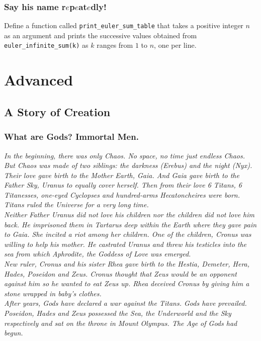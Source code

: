 \documentclass[a4paper]{article}
\begin{document}
\subsubsection{Say his name r$e$p$e$at$e$dly!}
Define a function called \texttt{print\_euler\_sum\_table} that takes a positive integer $n$ as an argument and prints the successive values obtained from \texttt{euler\_infinite\_sum(k)} as $k$ ranges from $1$ to $n$, one per line.


\newpage
\section{Advanced}
\subsection{A Story of Creation}

\subsubsection{What are Gods? Immortal Men.}

\textit{In the beginning, there was only Chaos. No space, no time just endless Chaos. But Chaos was made of two siblings: the darkness (Erebus) and the night (Nyx). Their love gave birth to the Mother Earth, Gaia. And Gaia gave birth to the Father Sky, Uranus to equally cover herself. Then from their love 6 Titans, 6 Titanesses, one-eyed Cyclopses and hundred-arms Hecatoncheires were born. Titans ruled the Universe for a very long time.\\
Neither Father Uranus did not love his children nor the children did not love him back. He imprisoned them in Tartarus deep within the Earth where they gave pain to Gaia. She incited a riot among her children. One of the children, Cronus was willing to help his mother. He castrated Uranus and threw his testicles into the sea from which Aphrodite, the Goddess of Love was emerged.\\
New ruler, Cronus and his sister Rhea gave birth to the Hestia, Demeter, Hera, Hades, Poseidon and Zeus. Cronus thought that Zeus would be an opponent against him so he wanted to eat Zeus up. Rhea deceived Cronus by giving him a stone wrapped in baby's clothes.\\
After years, Gods have declared a war against the Titans. Gods have prevailed. Poseidon, Hades and Zeus possessed the Sea, the Underworld and the Sky respectively and sat on the throne in Mount Olympus. The Age of Gods had begun.}
\end{document}
